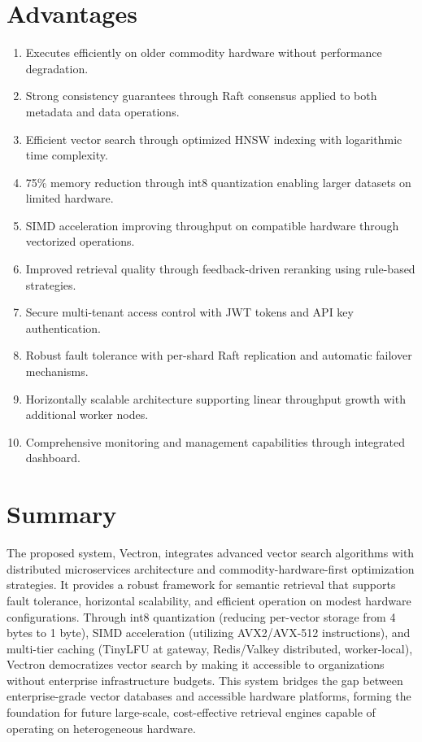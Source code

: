 \section{Advantages}
\begin{enumerate}
    \item Executes efficiently on older commodity hardware without performance degradation.
    \item Strong consistency guarantees through Raft consensus applied to both metadata and data operations.
    \item Efficient vector search through optimized HNSW indexing with logarithmic time complexity.
    \item 75\% memory reduction through int8 quantization enabling larger datasets on limited hardware.
    \item SIMD acceleration improving throughput on compatible hardware through vectorized operations.
    \item Improved retrieval quality through feedback-driven reranking using rule-based strategies.
    \item Secure multi-tenant access control with JWT tokens and API key authentication.
    \item Robust fault tolerance with per-shard Raft replication and automatic failover mechanisms.
    \item Horizontally scalable architecture supporting linear throughput growth with additional worker nodes.
    \item Comprehensive monitoring and management capabilities through integrated dashboard.
\end{enumerate}

\section{Summary}
The proposed system, Vectron, integrates advanced vector search algorithms with distributed microservices architecture and commodity-hardware-first optimization strategies. It provides a robust framework for semantic retrieval that supports fault tolerance, horizontal scalability, and efficient operation on modest hardware configurations. Through int8 quantization (reducing per-vector storage from 4 bytes to 1 byte), SIMD acceleration (utilizing AVX2/AVX-512 instructions), and multi-tier caching (TinyLFU at gateway, Redis/Valkey distributed, worker-local), Vectron democratizes vector search by making it accessible to organizations without enterprise infrastructure budgets. This system bridges the gap between enterprise-grade vector databases and accessible hardware platforms, forming the foundation for future large-scale, cost-effective retrieval engines capable of operating on heterogeneous hardware.